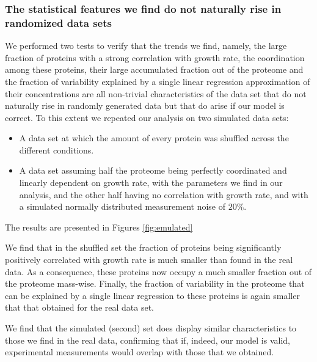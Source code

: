 \subsubsection{The statistical features we find do not naturally rise in randomized data sets}
We performed two tests to verify that the trends we find, namely, the large fraction of proteins with a strong correlation with growth rate, the coordination among these proteins, their large accumulated fraction out of the proteome and the fraction of variability explained by a single linear regression approximation of their concentrations are all non-trivial characteristics of the data set that do not naturally rise in randomly generated data but that do arise if our model is correct.
To this extent we repeated our analysis on two simulated data sets:
\begin{itemize}
\item A data set at which the amount of every protein was shuffled across the different conditions.
\item A data set assuming half the proteome being perfectly coordinated and linearly dependent on growth rate, with the parameters we find in our analysis, and the other half having no correlation with growth rate, and with a simulated normally distributed measurement noise of $20\%$.
\end{itemize}
The results are presented in Figures \ref{fig:emulated}

We find that in the shuffled set the fraction of proteins being significantly positively correlated with
growth rate is much smaller than found in the real data.
As a consequence, these proteins now occupy a much smaller fraction out of the proteome mass-wise.
Finally, the fraction of variability in the proteome that can be explained by a single linear regression to these proteins is again smaller that that obtained for the real data set.

We find that the simulated (second) set does display similar characteristics to those we find in the real data, confirming that if, indeed, our model is valid, experimental measurements would overlap with those that we obtained.